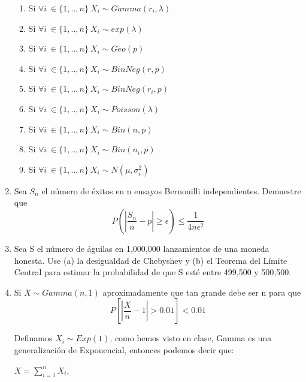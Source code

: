 \documentclass[11pt,a4paper]{report}
\begin{document}
\begin{enumerate}
{\begin{enumerate}
			    \item{Si $\forall i \ \in \lbrace 1,..,n \rbrace \ X_{i} \sim Gamma(r_{i},\lambda)$ }
                \item{Si $\forall i \ \in \lbrace 1,..,n \rbrace \ X_{i} \sim exp(\lambda)$ }
                \item{Si $\forall i \ \in \lbrace 1,..,n \rbrace \ X_{i} \sim Geo(p)$ }
                \item{Si $\forall i \ \in \lbrace 1,..,n \rbrace \ X_{i} \sim BinNeg(r,p)$ }
                \item{Si $\forall i \ \in \lbrace 1,..,n \rbrace \ X_{i} \sim BinNeg(r_{i},p)$ }
                \item{Si $\forall i \ \in \lbrace 1,..,n \rbrace \ X_{i} \sim Poisson(\lambda)$ }
                \item{Si $\forall i \ \in \lbrace 1,..,n \rbrace \ X_{i} \sim Bin(n,p)$ }
                \item{Si $\forall i \ \in \lbrace 1,..,n \rbrace \ X_{i} \sim Bin(n_{i},p)$ }
                \item{Si $\forall i \ \in \lbrace 1,..,n \rbrace \ X_{i} \sim N(\mu,\sigma_{i}^2)$ }
			\end{enumerate}
		}

		\item{
		Sea $S_{n}$ el número de éxitos en n ensayos Bernouilli independientes. Demuestre que $$P(|\frac{S_{n}}{n}-p|\geq \epsilon)\leq \frac{1}{4n\epsilon^2}$$
			
		}

		\item{
		Sea S el número de águilas en 1,000,000 lanzamientos de una moneda honesta. Use (a) la desigualdad de Chebyshev y (b) el Teorema del Límite Central para estimar la probabilidad de que S esté entre 499,500 y 500,500.
		}

		\item{
			
          Si $X \sim Gamma(n,1)$ aproximadamente que tan grande debe ser n para que 
          $$P[|\frac{X}{n}-1| > 0.01] < 0.01$$
          
          Definamos $X_{i} \sim Exp(1)$, como hemos visto en clase, Gamma es una generalización de Exponencial, entonces podemos decir que:
          
          $X = \sum_{i=1}^{n} X_{i}$,
          
}
\end{enumerate}
\end{document}
